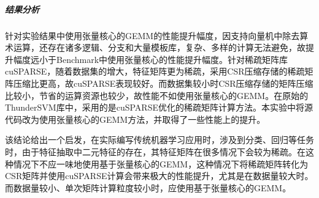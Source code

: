\subparagraph{结果分析}
\par 针对实验结果中使用张量核心的GEMM的性能提升幅度，因支持向量机中除去算术运算，还存在诸多逻辑、分支和大量模板库，复杂、多样的计算无法避免，故提升幅度远小于Benchmark中使用张量核心的性能提升幅度。针对稀疏矩阵库cuSPARSE，随着数据集的增大，特征矩阵更为稀疏，采用CSR压缩存储的稀疏矩阵压缩比更高，故cuSPARSE表现较好。而数据集较小时CSR压缩存储的矩阵压缩比较小，节省的运算资源也较少，故性能不如使用张量核心的GEMM。在原始的ThunderSVM库中，采用的是cuSPARSE优化的稀疏矩阵计算方法。本实验中将源代码改为使用张量核心的GEMM方法，并取得了一些性能上的提升。
\par 该结论给出一个启发，在实际编写传统机器学习应用时，涉及到分类、回归等任务时，由于特征抽取中二元特征的存在，其特征矩阵在很多情况下会较为稀疏。在这种情况下不应一味地使用基于张量核心的GEMM，这种情况下将稀疏矩阵转化为CSR矩阵并使用cuSPARSE计算会带来极大的性能提升，尤其是在数据量较大时。而数据量较小、单次矩阵计算粒度较小时，应使用基于张量核心的GEMM。

